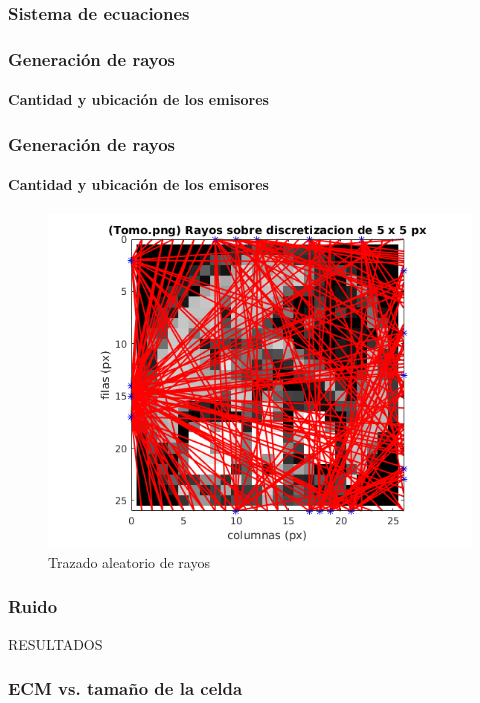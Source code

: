 \documentclass[11pt]{beamer}
\begin{document}
\begin{frame}
\frametitle{Sistema de ecuaciones}
\end{frame}


\begin{frame}
\frametitle{Generación de rayos}
\framesubtitle{Cantidad y ubicación de los emisores}
\end{frame}


\begin{frame}
\frametitle{Generación de rayos}
\framesubtitle{Cantidad y ubicación de los emisores}
\begin{figure}[H] 
\centering
\includegraphics[scale=0.5]{img/rayos_tomo25x25px.png}
\caption{Trazado aleatorio de rayos}
\label{fig:rayos aleatorios}
\end{figure}
\end{frame}


\begin{frame}
\frametitle{Ruido}
\end{frame}


\begin{frame}{RESULTADOS}
\frametitle{ECM vs. tamaño de la celda}
\end{frame}
\end{document}
